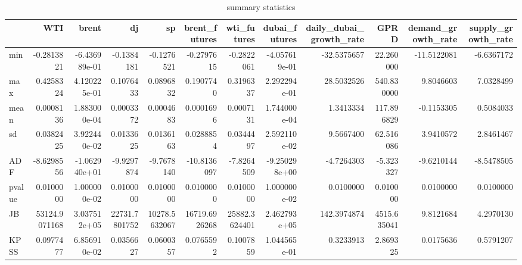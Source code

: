\begin{table}
\centering
\caption{summary statistics}
\centering
\begin{tabular}[t]{l|r|r|r|r|r|r|r|r|r|r|r}
\hline
  & WTI & brent & dj & sp & brent\_futures & wti\_futures & dubai\_futures & daily\_dubai\_growth\_rate & GPRD & demand\_growth\_rate & supply\_growth\_rate\\
\hline
min & -0.2813821 & -6.436989e-01 & -0.1384181 & -0.1276521 & -0.2797615 & -0.2822061 & -4.057619e-01 & -32.5375657 & 22.260000 & -11.5122081 & -6.6367172\\
\hline
max & 0.4258324 & 4.120225e-01 & 0.1076433 & 0.0896832 & 0.1907740 & 0.3196337 & 2.292294e-01 & 28.5032526 & 540.830000 & 9.8046603 & 7.0328499\\
\hline
mean & 0.0008136 & 1.883000e-04 & 0.0003372 & 0.0004683 & 0.0001696 & 0.0007131 & 1.744000e-04 & 1.3413334 & 117.896829 & -0.1153305 & 0.5084033\\
\hline
sd & 0.0382425 & 3.922440e-02 & 0.0133625 & 0.0136163 & 0.0288854 & 0.0344497 & 2.592110e-02 & 9.5667400 & 62.516086 & 3.9410572 & 2.8461467\\
\hline
ADF & -8.6298556 & -1.062940e+01 & -9.9297874 & -9.7678140 & -10.8136097 & -7.8264509 & -9.250298e+00 & -4.7264303 & -5.323327 & -9.6210144 & -8.5478505\\
\hline
pvalue & 0.0100000 & 1.000000e-02 & 0.0100000 & 0.0100000 & 0.0100000 & 0.0100000 & 1.000000e-02 & 0.0100000 & 0.010000 & 0.0100000 & 0.0100000\\
\hline
JB & 53124.9071168 & 3.037512e+05 & 22731.7801752 & 10278.5632067 & 16719.6926268 & 25882.3624401 & 2.462793e+05 & 142.3974874 & 4515.635041 & 9.8121684 & 4.2970130\\
\hline
KPSS & 0.0977477 & 6.856910e-02 & 0.0356627 & 0.0600357 & 0.0765592 & 0.1007859 & 1.044565e-01 & 0.3233913 & 2.869325 & 0.0175636 & 0.5791207\\
\hline
\end{tabular}
\end{table}
